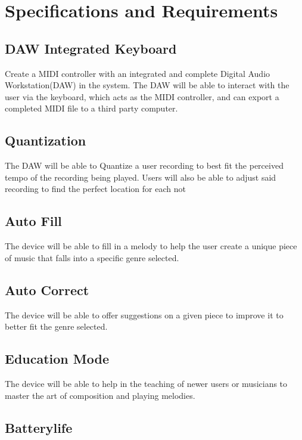 \section{Specifications and Requirements}

\subsection{DAW Integrated Keyboard}

Create a MIDI controller with an integrated and complete Digital Audio
Workstation(DAW) in the system. The DAW will be able to interact with the user
via the keyboard, which acts as the MIDI controller, and can export a completed
MIDI file to a third party computer.

\subsection{Quantization}

The DAW will be able to Quantize a user recording to best fit the perceived
tempo of the recording being played. Users will also be able to adjust said
recording to find the perfect location for each not

\subsection{Auto Fill}

The device will be able to fill in a melody to help the user create a unique
piece of music that falls into a specific genre selected.

\subsection{Auto Correct}

The device will be able to offer suggestions on a given piece to improve it to
better fit the genre selected.

\subsection{Education Mode}

The device will be able to help in the teaching of newer users or musicians to
master the art of composition and playing melodies.

\subsection{Batterylife}


